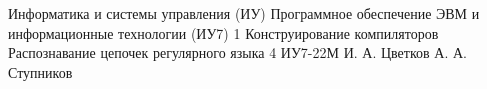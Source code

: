 \makereporttitle
{Информатика и системы управления (ИУ)}
{Программное обеспечение ЭВМ и информационные технологии (ИУ7)}
{1}
{Конструирование компиляторов}
{Распознавание цепочек регулярного языка}
{4}
{ИУ7-22М}
{И. А. Цветков}
{А. А. Ступников}
